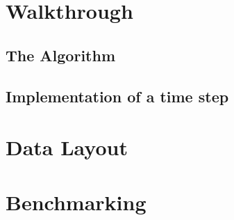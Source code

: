 \documentclass[11pt,a4paper]{article}
\begin{document}
\section{Walkthrough}


\subsection{The Algorithm}


\subsection{Implementation of a time step}


\section{Data Layout}


\section{Benchmarking}

%
%
\end{document}

